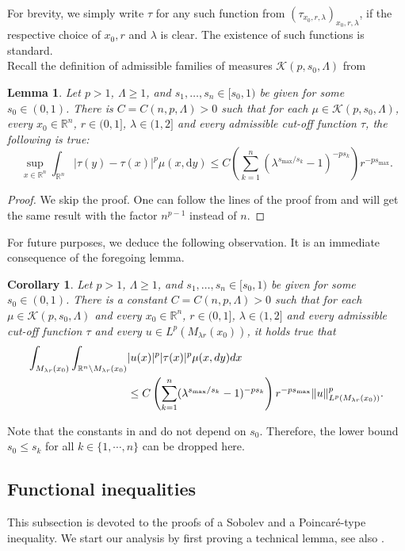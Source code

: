 \documentclass[11pt]{amsart}
\theoremstyle{plain}
\newtheorem{lemma}[theorem]{Lemma}
\newtheorem{corollary}[theorem]{Corollary}
\theoremstyle{definition}
\numberwithin{equation}{section}
\renewcommand{\d}{\textnormal{d}}
\newcommand{\R}{\mathbb{R}}
\newcommand{\cK}{\mathcal{K}}
\begin{document}
For brevity, we simply write $\tau$ for any such function from $(\tau_{x_0,r,\lambda})_{x_0,r,\lambda}$, if the respective choice of $x_0, r$ and $\lambda$ is clear. The existence of such functions is standard. \\
Recall the definition of admissible families of measures $\cK(p,s_0,\Lambda)$ from 
\begin{lemma}\label{lemma:cutoff}
Let $p> 1$, $\Lambda \ge 1$, and $s_1,\dots,s_n\in[s_0,1)$ be given for some $s_0\in(0,1)$. There is $C = C(n,p,\Lambda) > 0$ such that for each $\mu\in\cK(p,s_0,\Lambda)$, every $x_0\in\R^n$, $r \in (0,1]$, $\lambda \in (1,2]$ and every admissible cut-off function $\tau$, the following is true:
\begin{equation*}
\sup_{x\in\R^n} \int_{\mathbb{R}^n} |\tau(y)-\tau(x)|^p \mu(x,\mathrm{d}y) \leq C \left( \sum_{k=1}^n \left( \lambda^{s_{\max}/s_k}-1 \right)^{-ps_k} \right) r^{-ps_{\max}}.
\end{equation*}
\end{lemma}
\begin{proof}
We skip the proof. One can follow the lines of the proof from \cite[Lemma 3.1]{CKW19} and will get the same result with the factor $n^{p-1}$ instead of $n$.
\end{proof}
For future purposes, we deduce the following observation. It is an immediate consequence of the foregoing lemma.
\begin{corollary}\label{cor:quadrat}
Let $p> 1$, $\Lambda \ge 1$, and $s_1,\dots,s_n\in[s_0,1)$ be given for some $s_0\in(0,1)$. There is a constant $C = C(n,p,\Lambda) > 0$ such that for each $\mu \in \cK(p,s_0,\Lambda)$ and every $x_0 \in \R^n$, $r \in (0,1]$, $\lambda \in (1,2]$ and every admissible cut-off function $\tau$ and every $u \in L^p(M_{\lambda r}(x_0))$, it holds true that
\begin{align*}
  \int_{M_{\lambda r}(x_0)} \int_{\R^n \setminus M_{\lambda r}(x_0)} &|u(x)|^p|\tau(x)|^p \mu(x,\d y) \d x \\
  &\le C \left( \sum_{k=1}^n (\lambda^{s_{\max}/s_k} - 1)^{-ps_k}\right) r^{-ps_{\max}} \Vert u \Vert_{L^p(M_{\lambda r}(x_0))}^p.
\end{align*}
\end{corollary}
Note that the constants in  and  do not depend on $s_0$. Therefore, the lower bound $s_0 \leq s_k$ for all $k \in \lbrace 1,\cdots, n\rbrace$ can be dropped here.

\subsection{Functional inequalities}
This subsection is devoted to the proofs of a Sobolev and a Poincar\'{e}-type inequality.
We start our analysis by first proving a technical lemma, see also \cite[Lemma 4.1]{CKW19}.
\end{document}
